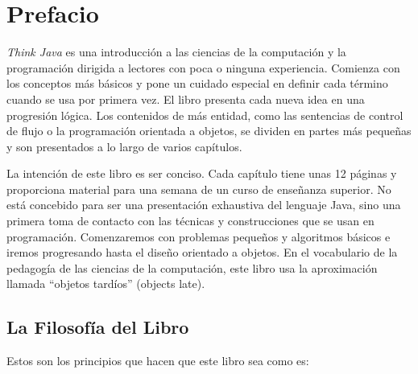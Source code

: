 \chapter*{Prefacio}


{\it Think Java} es una introducción a las ciencias de la computación y la programación dirigida a lectores con poca o ninguna experiencia.
Comienza con los conceptos más básicos y pone un cuidado especial en definir cada término cuando se usa por primera vez.
El libro presenta cada nueva idea en una progresión lógica.
Los contenidos de más entidad, como las sentencias de control de flujo o la programación orientada a objetos, se dividen en partes más pequeñas y son presentados a lo largo de varios capítulos.

La intención de este libro es ser conciso.
Cada capítulo tiene unas 12 páginas y proporciona material para una semana de un curso de enseñanza superior.
No está concebido para ser una presentación exhaustiva del lenguaje Java, sino una primera toma de contacto con las técnicas y construcciones que se usan en programación. 
Comenzaremos con problemas pequeños y algoritmos básicos e iremos progresando hasta el diseño orientado a objetos.
En el vocabulario de la pedagogía de las ciencias de la computación, este libro usa la aproximación llamada ``objetos tardíos'' (objects late).


\section*{La Filosofía del Libro}

Estos son los principios que hacen que este libro sea como es:

